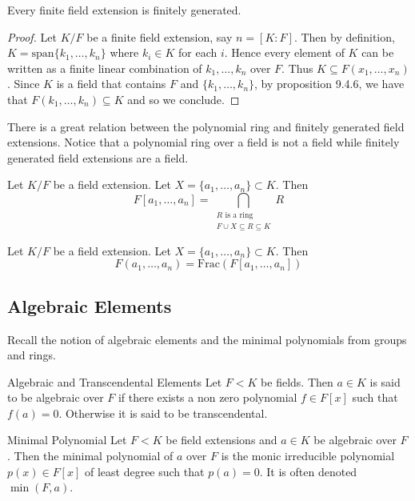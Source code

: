 \documentclass[a4paper]{article}
\begin{document}
\begin{prp}{}{} Every finite field extension is finitely generated. \tcbline
\begin{proof}
Let $K/F$ be a finite field extension, say $n=[K:F]$. Then by definition, $K=\text{span}\{k_1,\dots,k_n\}$ where $k_i\in K$ for each $i$. Hence every element of $K$ can be written as a finite linear combination of $k_1,\dots,k_n$ over $F$. Thus $K\subseteq F(x_1,\dots,x_n)$. Since $K$ is a field that contains $F$ and $\{k_1,\dots,k_n\}$, by proposition 9.4.6, we have that $F(k_1,\dots,k_n)\subseteq K$ and so we conclude. 
\end{proof}
\end{prp}

There is a great relation between the polynomial ring and finitely generated field extensions. Notice that a polynomial ring over a field is not a field while finitely generated field extensions are a field. 

\begin{prp}{}{} Let $K/F$ be a field extension. Let $X=\{a_1,\dots,a_n\}\subset K$. Then $$F[a_1,\dots,a_n]=\bigcap_{\substack{R\text{ is a ring}\\F\cup X\subseteq R\subseteq K}}R$$
\end{prp}

\begin{prp}{}{} Let $K/F$ be a field extension. Let $X=\{a_1,\dots,a_n\}\subset K$. Then $$F(a_1,\dots,a_n)=\text{Frac}\left(F[a_1,\dots,a_n]\right)$$
\end{prp}

\subsection{Algebraic Elements}
Recall the notion of algebraic elements and the minimal polynomials from groups and rings. 

\begin{defn}{Algebraic and Transcendental Elements}{} Let $F<K$ be fields. Then $a\in K$ is said to be algebraic over $F$ if there exists a non zero polynomial $f\in F[x]$ such that $f(a)=0$. Otherwise it is said to be transcendental. 
\end{defn}

\begin{defn}{Minimal Polynomial}{} Let $F<K$ be field extensions and $a\in K$ be algebraic over $F$. Then the minimal polynomial of $a$ over $F$ is the monic irreducible polynomial $p(x)\in F[x]$ of least degree such that $p(a)=0$. It is often denoted $\min(F,a)$. 
\end{defn}
\end{document}

